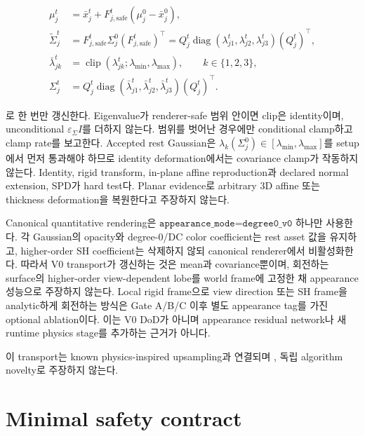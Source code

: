 \documentclass[11pt]{article}
\begin{document}
\begin{equation}
\begin{aligned}
  \mu_j^t
  &=
  \bar x_j^t+F_{j,\mathrm{safe}}^t(\mu_j^0-\bar x_j^0),\\
  \widetilde\Sigma_j^t
  &=
  F_{j,\mathrm{safe}}^t\Sigma_j^0(F_{j,\mathrm{safe}}^t)^\top
  =Q_j^t\operatorname{diag}(\lambda_{j1}^t,\lambda_{j2}^t,\lambda_{j3}^t)(Q_j^t)^\top,\\
  \bar\lambda_{jk}^t
  &=\operatorname{clip}(\lambda_{jk}^t;\lambda_{\min},\lambda_{\max}),
  \qquad k\in\{1,2,3\},\\
  \Sigma_j^t
  &=
  Q_j^t\operatorname{diag}(\bar\lambda_{j1}^t,\bar\lambda_{j2}^t,\bar\lambda_{j3}^t)(Q_j^t)^\top .
\end{aligned}
  \label{eq:minimal-gaussian-transport}
\end{equation}

로 한 번만 갱신한다. Eigenvalue가 renderer-safe 범위 안이면 clip은 identity이며,
unconditional \(\varepsilon_\Sigma I\)를 더하지 않는다. 범위를 벗어난 경우에만 conditional clamp하고
clamp rate를 보고한다.
Accepted rest Gaussian은
\(\lambda_k(\Sigma_j^0)\in[\lambda_{\min},\lambda_{\max}]\)를 setup에서 먼저 통과해야 하므로
identity deformation에서는 covariance clamp가 작동하지 않는다.
Identity, rigid transform, in-plane affine reproduction과 declared normal extension, SPD가 hard test다.
Planar evidence로 arbitrary 3D affine 또는 thickness deformation을 복원한다고 주장하지 않는다.

Canonical quantitative rendering은
\(\texttt{appearance\_mode=degree0\_v0}\) 하나만 사용한다.
각 Gaussian의 opacity와 degree-0/DC color coefficient는 rest asset 값을 유지하고,
higher-order SH coefficient는 삭제하지 않되 canonical renderer에서 비활성화한다.
따라서 V0 transport가 갱신하는 것은 mean과 covariance뿐이며, 회전하는 surface의 higher-order
view-dependent lobe를 world frame에 고정한 채 appearance 성능으로 주장하지 않는다.
Local rigid frame으로 view direction 또는 SH frame을 analytic하게 회전하는 방식은
Gate A/B/C 이후 별도 appearance tag를 가진 optional ablation이다. 이는 V0 DoD가 아니며
appearance residual network나 새 runtime physics stage를 추가하는 근거가 아니다.

이 transport는 known physics-inspired upsampling과 연결되며
\cite{kavan2011upsampling}, 독립 algorithm novelty로 주장하지 않는다.

\section{Minimal safety contract}
\end{document}
